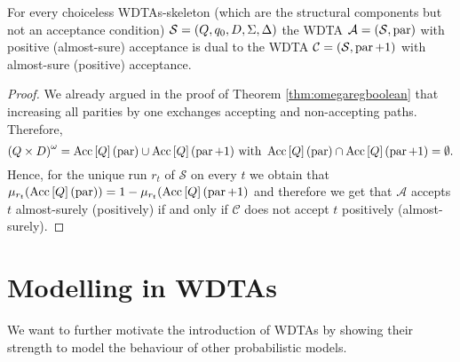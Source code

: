 \begin{proposition}
  For every choiceless \acp{WDTA}-skeleton (which are the structural components
  but not an acceptance condition) 
  $\mathcal{S} = \left(Q, q_{0}, D, \Sigma, \Delta\right)$ the
  \ac{WDTA} $\mathcal{A} = \left(\mathcal{S}, \operatorname{par}\right)$ with positive
  (almost-sure) acceptance is dual to the \ac{WDTA}
  $\mathcal{C} = \left(\mathcal{S}, \operatorname{par} + 1\right)$ with almost-sure (positive)
  acceptance.
\end{proposition}
\begin{proof}
  We already argued in the proof of Theorem \ref{thm:omegaregboolean} that
  increasing all parities by one exchanges accepting and non-accepting paths.
  Therefore,
  \begin{equation*}
    \left(Q\times D\right)^{\omega} = 
      \operatorname{Acc}\left[Q\right](\operatorname{par})\cup\operatorname{Acc}\left[Q\right](\operatorname{par} + 1)
    \text{ with }
      \operatorname{Acc}\left[Q\right](\operatorname{par})\cap\operatorname{Acc}\left[Q\right](\operatorname{par} + 1) = \emptyset.
  \end{equation*}
  Hence, for the unique run $r_{t}$ of $\mathcal{S}$ on every $t$ we obtain
  that $\mu_{r_{t}}(\operatorname{Acc}\left[Q\right](\operatorname{par})) =
    1 - \mu_{r_{t}}(\operatorname{Acc}\left[Q\right](\operatorname{par} + 1)$ and therefore we get that
  $\mathcal{A}$ accepts $t$ almost-surely (positively) if and only if
  $\mathcal{C}$ does not accept $t$ positively (almost-surely).
\end{proof}

\section{Modelling in \aclp{WDTA}}
We want to further motivate the introduction of \acp{WDTA} by showing their
strength to model the behaviour of other probabilistic models.
